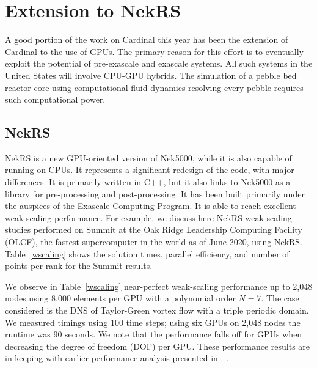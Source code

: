 \section{Extension to NekRS}
\label{s:nrs}

A good portion of the work on Cardinal this year has been the extension of Cardinal to the use of GPUs. The primary reason for this effort is to eventually exploit the potential of pre-exascale and exascale systems.
All such systems in the United States will involve CPU-GPU hybrids. The simulation of a pebble bed reactor core using computational fluid dynamics resolving every pebble requires such computational power.

\subsection{NekRS}

NekRS is a new GPU-oriented version of Nek5000, while it is also capable of running on CPUs. It represents a significant redesign of the code, with major differences. It is primarily written in C++, but it also links to Nek5000 as a library for pre-processing and post-processing. It has been built primarily under the auspices of the Exascale Computing Program. It is able to reach excellent weak scaling performance. For example, we discuss here NekRS weak-scaling studies performed on Summit at the Oak Ridge Leadership Computing Facility (OLCF), the fastest supercomputer in the world as of June 2020, using NekRS. Table~\ref{wscaling} shows the solution times, parallel efficiency, and number of points per rank for the Summit results.

We observe in Table~\ref{wscaling} near-perfect weak-scaling performance up to 2,048 nodes using 8,000 elements per GPU with a polynomial order  $N=7$. The case considered is the DNS of Taylor-Green vortex flow with a triple periodic domain. We measured timings using 100 time steps; using six GPUs on 2,048 nodes the runtime was 90 seconds. 
We note that the performance falls off for GPUs when decreasing the degree of freedom (DOF) per GPU.  
These performance results are in keeping with earlier performance analysis presented in \cite{fischer15,min2015a}. .

